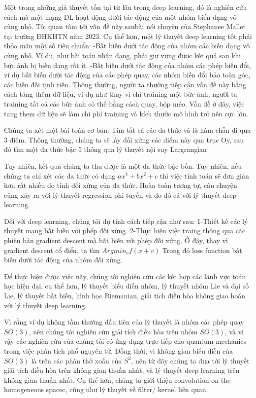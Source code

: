Một trong những giả thuyết tồn tại từ lâu trong deep learning, đó là nghiên cứu cách mà  một mạng DL hoạt động dưới tác động của một nhóm  biến dạng vô cùng nhỏ. Tôi quan tâm tới vấn đề này saubài nói chuyện của Stephanee Mallet tại trường ĐHKHTN năm 2023.
Cụ thể hơn, một lý thuyết deep learning tốt phải thỏa mãn một số tiêu chuẩn:
-Bất biến dưới tác động của nhóm các biến dạng vô cùng nhỏ. Ví dụ, như bài toán nhận dạng, phải giữ vững được kết quả sau khi bức ảnh bị biến dạng rất ít.
-Bất biến dưới tác động của nhóm các phép biến đổi, ví dụ bất biến dưới tác động của các phép quay, các nhóm biến đổi bảo toàn góc, các biến đối tịnh tiến.
Thông thường, người ta thường tiếp cận vấn đề này bằng cách tăng thêm dữ liệu, ví dụ như thay vì chỉ training một bức ảnh, người ta training tất cả các bức ảnh có thể bằng cách quay, bóp méo. Vấn đề ở đây, việc tang them dữ liệu sẽ làm chi phí training và kích thước mô hình trở nên cực lớn.

Chúng ta xét một bài toán cơ bản: Tìm tất cả các đa thức và là hàm chẵn đi qua 3 điểm.
Thông thường, chúng ta sẽ lấy đối xứng các điểm này qua trục Oy, sau đó tìm một đa thức bậc 5  thông qua lý thuyết nội suy Largrangian

\begin{center}
\end{center}

Tuy nhiên, kết quả chúng ta thu được là một đa thức bậc bốn. Tuy nhiên, nếu chúng ta chỉ xét các đa thức có dạng $ax^4+bx^2+c$ thì việc tính toán sẽ đơn giản hơn rất nhiều do tính đối xứng của đa thức.
Hoàn toàn tương tự, câu chuyện cũng xảy ra với lý thuyết regression phi tuyến và do đó cả với lý thuyết deep learning.

Đối với deep learning, chúng tôi dự tính cách tiếp cận như sau:
1-Thiết kế các lý thuyết mạng bất biến với phép đối xứng.
2-Thực hiện việc traing thông qua các phiên bản gradient descent mà bất biến với phép đối xứng.
Ở đây, thay vì gradient descent cổ điển, ta tìm $Argmin_v f(x+v) $ 
Trong đó loss function bất biến dưới tác động của nhóm đối xứng.


Để thực hiện được việc này, chúng tôi nghiên cứu các kết hợp các lãnh vực toán học hiện đại, cụ thể hơn, lý thuyết biểu diễn nhóm, lý thuyết nhóm Lie và đại số Lie, lý thuyết bất biến, hình học Riemanian, giải tích điều hòa không giao hoán với lý thuyết deep learning. 

Vì rằng ví dụ không tầm thường đầu tiên của lý thuyết là nhóm các phép quay $SO(3)$, nên chúng tôi nghiên cứu giải tích điều hòa trên nhóm $SO(3)$, và vì vậy  các nghiên cứu của chúng tôi có ứng dụng trực tiếp cho quantum mechanics trong việc phân tích phổ nguyên tử. 
Đồng thời, vì không gian biểu diễn của $SO(3)$ là trên các phân thớ xoắn của $S^2$, nên từ đây chúng ta đưa tới lý thuyết giải tích điều hòa trên không gian thuần nhất, và lý thuyết deep learning trên không gian thuần nhất.
Cụ thể hơn, chúng ta giới thiệu convolution on the homogeneous spacec, cũng như lý thuyết về filter/ kernel liên quan.


